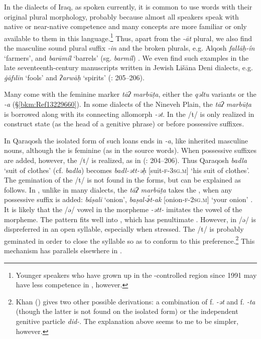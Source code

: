 \documentclass[output=paper]{langsci/langscibook}
\begin{document}
In the  dialects of Iraq, as spoken currently, it is common to use  words with their original plural morphology, probably because almost all speakers speak  with native or near-native competence and many concepts are more familiar or only available to them in this language.\footnote{Younger  speakers who have grown up in the -controlled region since 1991 may have less competence in , however.} Thus, apart from the \textit{\nobreakdash-āt} plural, we also find the masculine sound plural suffix \textit{{}-in} and the  broken plurals, e.g.  Alqosh \textit{fallāḥ\nobreakdash-ín} ‘farmers’, and \textit{barāmíl} ‘barrels’ (sg. \textit{barmíl}) \citep[273]{Coghill2004}. We even find such examples in the late seventeenth-century manuscripts written in Jewish Lišāna Deni dialects, e.g. \textit{\.gāfılīn} ‘fools’ and \textit{ʔarwāḥ} ‘spirits’ (\citealt{Sabar1984}: 205–206).

Many   come with the  feminine marker \textit{tāʔ} \textit{marbūṭa}, either the \textit{qəltu}  variants or the   \textit{\nobreakdash-a} (§\ref{bkm:Ref13229660}). In some dialects of the Nineveh Plain, the \textit{tāʔ} \textit{marbūṭa} is borrowed along with its connecting allomorph \textit{{}-ət}. In  the /t/ is only realized in construct state (as the head of a genitive phrase) or before possessive suffixes.

In  Qaraqosh the isolated form of such loans ends in \textit{{}-a}, like inherited masculine nouns, although the  is feminine (as in the source words). When possessive suffixes are added, however, the /t/ is realized, as in  (\citealt{Khan2002}: 204–206). Thus Qaraqosh \textit{badla} ‘suit of clothes’ (cf.   \textit{badla}) becomes \textit{badl\nobreakdash-ətt\nobreakdash-əḥ} [suit-\textsc{f-3sg.m]} ‘his suit of clothes’. The gemination of the /t/ is not found in the  forms, but can be explained as follows. In  , unlike in many  dialects, the \textit{tāʔ} \textit{marbūṭa} takes the , when any possessive suffix is added: \textit{báṣali} ‘onion’, \textit{baṣal\nobreakdash-ә́t\nobreakdash-ak} [onion-\textsc{f-2sg.m}] ‘your onion’ \citep[105]{Jastrow1983}. It is likely that the /ə/ vowel in the  morpheme \textit{{}-ətt-} imitates the vowel of the  morpheme. The  pattern fits well into , which has penultimate . However, in  /ə/ is dispreferred in an open syllable, especially when stressed. The /t/ is probably geminated in order to close the syllable so as to conform to this preference.\footnote{Khan (\citeyear[206]{Khan2002}) gives two other possible derivations: a combination of  f. \textit{\nobreakdash-ət} and  f. \textit{\nobreakdash-ta} (though the latter is not found on the isolated form) or the  independent genitive particle \textit{did-}. The explanation above seems to me to be simpler, however.} This mechanism has parallels elsewhere in .
\end{document}
